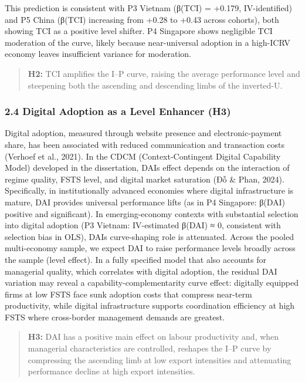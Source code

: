 \documentclass[12pt,a4paper]{article}
\begin{document}
This prediction is consistent with P3 Vietnam (β(TCI) = +0.179,
IV-identified) and P5 China (β(TCI) increasing from +0.28 to +0.43
across cohorts), both showing TCI as a positive level shifter. P4
Singapore shows negligible TCI moderation of the curve, likely because
near-universal adoption in a high-ICRV economy leaves insufficient
variance for moderation.

\begin{quote}
\textbf{H2:} TCI amplifies the I--P curve, raising the average
performance level and steepening both the ascending and descending limbs
of the inverted-U.
\end{quote}

\hypertarget{24-digital-adoption-as-a-level-enhancer-h3}{%
\subsubsection{2.4 Digital Adoption as a Level Enhancer
(H3)}\label{24-digital-adoption-as-a-level-enhancer-h3}}

Digital adoption, measured through website presence and
electronic-payment share, has been associated with reduced communication
and transaction costs (Verhoef et al., 2021). In the CDCM
(Context-Contingent Digital Capability Model) developed in the
dissertation, DAI\textquotesingle s effect depends on the interaction of
regime quality, FSTS level, and digital market saturation (Đỗ \& Phan,
2024). Specifically, in institutionally advanced economies where digital
infrastructure is mature, DAI provides universal performance lifts (as
in P4 Singapore: β(DAI) positive and significant). In emerging-economy
contexts with substantial selection into digital adoption (P3 Vietnam:
IV-estimated β(DAI) ≈ 0, consistent with selection bias in OLS),
DAI\textquotesingle s curve-shaping role is attenuated. Across the
pooled multi-economy sample, we expect DAI to raise performance levels
broadly across the sample (level effect). In a fully specified model
that also accounts for managerial quality, which correlates with digital
adoption, the residual DAI variation may reveal a
capability-complementarity curve effect: digitally equipped firms at low
FSTS face sunk adoption costs that compress near-term productivity,
while digital infrastructure supports coordination efficiency at high
FSTS where cross-border management demands are greatest.

\begin{quote}
\textbf{H3:} DAI has a positive main effect on labour productivity and,
when managerial characteristics are controlled, reshapes the I--P curve
by compressing the ascending limb at low export intensities and
attenuating performance decline at high export intensities.
\end{quote}
\end{document}
